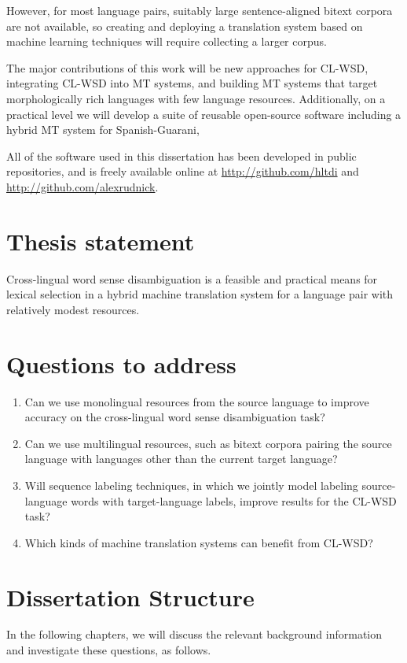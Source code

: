However, for most language pairs, suitably large
sentence-aligned bitext corpora are not available,
so creating and deploying a
translation system based on machine learning techniques will require collecting
a larger corpus.

The major contributions of this work will be new approaches for CL-WSD,
integrating CL-WSD into MT systems, and building MT systems that target
morphologically rich languages with few language resources.  Additionally, on a
practical level we will develop a suite of reusable open-source software
including a hybrid MT system for Spanish-Guarani,

All of the software used in this dissertation has been developed in public
repositories, and is freely available online at
\url{http://github.com/hltdi} and \url{http://github.com/alexrudnick}.

\section{Thesis statement}
Cross-lingual word sense disambiguation is a feasible and practical
means for lexical selection in a hybrid machine translation system for a
language pair with relatively modest resources.

\section{Questions to address}
\begin{enumerate}
\item Can we use monolingual resources from the source language to improve
accuracy on the cross-lingual word sense disambiguation task?
\item Can we use multilingual resources, such as bitext corpora pairing the
source language with languages other than the current target language?
\item Will sequence labeling techniques, in which we jointly model labeling
source-language words with target-language labels, improve results for the
CL-WSD task?
\item Which kinds of machine translation systems can benefit from CL-WSD?
\end{enumerate}

\section{Dissertation Structure}
In the following chapters, we will discuss the relevant background information
and investigate these questions, as follows.

